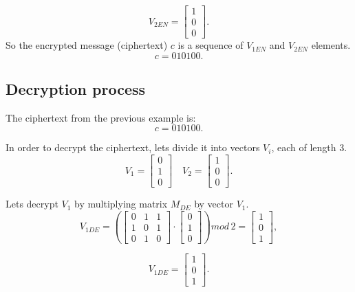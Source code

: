 \documentclass{article}
\begin{document}
        $$
        V_{2EN}=\begin{bmatrix}
        1  \\
        0  \\
        0  
        \end{bmatrix}.$$
        \vspace{5mm}
        So the encrypted message (ciphertext) $c$ is a sequence of $V_{1EN}$ and $V_{2EN}$ elements. 
        $$c = 010100.$$
\newpage
    \subsection{Decryption process}
        The ciphertext from the previous example is:
        $$c = 010100.$$
        
        In order to decrypt the ciphertext, lets divide it into vectors $V_i$, each of length $3$.
        \vspace{1mm}
        $$V_1=\begin{bmatrix}
        0  \\
        1  \\
        0  
        \end{bmatrix} \quad
        V_2=\begin{bmatrix}
        1  \\
        0  \\
        0  
        \end{bmatrix}.$$

        Lets decrypt $V_1$ by multiplying matrix $M_{DE}$ by vector $V_1$.
        $$
        V_{1DE}=
        \left(
        \begin{bmatrix}
        0 & 1 & 1 \\
        1 & 0 & 1 \\
        0 & 1 & 0
        \end{bmatrix} \cdot
        \begin{bmatrix}
        0  \\
        1  \\
        0  
        \end{bmatrix}
        \right)
        mod \, 2
        =
        \begin{bmatrix}
        1  \\
        0  \\
        1  
        \end{bmatrix},
        $$
        
        $$
        V_{1DE}=\begin{bmatrix}
        1  \\
        0  \\
        1  
        \end{bmatrix}.$$
        \vspace{5mm}
        
\end{document}
